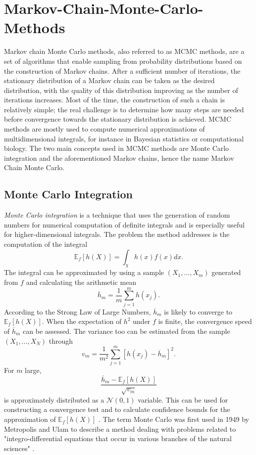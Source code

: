 \section{Markov-Chain-Monte-Carlo-Methods}
Markov chain Monte Carlo methods, also referred to as MCMC methods, are a set of algorithms that enable sampling from probability distributions based on the construction of Markov chains. After a sufficient number of iterations, the stationary distribution of a Markov chain can be taken as the desired distribution, with the quality of this distribution improving as the number of iterations increases. Most of the time, the construction of such a chain is relatively simple; the real challenge is to determine how many steps are needed before convergence towards the stationary distribution is achieved. MCMC methods are mostly used to compute numerical approximations of multidimensional integrals, for instance in Bayesian statistics or computational biology. The two main concepts used in MCMC methods are Monte Carlo integration and the aforementioned Markov chains, hence the name Markov Chain Monte Carlo.
\subsection{Monte Carlo Integration}
\textit{Monte Carlo integration} is a technique that uses the generation of random numbers for numerical computation of definite integrals and is especially useful for higher-dimensional integrals. The problem the method addresses is the computation of the integral
\begin{equation}
    \mathbb{E}_f\left[h\left(X\right)\right]=\int_\chi h(x)f(x)dx.
\end{equation}
The integral can be approximated by using a sample $\left(X_1,...,X_m\right)$ generated from $f$ and calculating the arithmetic mean
\begin{equation}
    \overline{h}_m=\frac{1}{m}\sum_{j=1}^mh\left(x_j\right).
\end{equation}
According to the Strong Law of Large Numbers, $\overline{h}_m$ is likely to converge to $\mathbb{E}_f\left[h\left(X\right)\right]$. When the expectation of $h^2$ under $f$ is finite, the convergence speed of $\overline{h}_m$ can be assessed. The variance too can be estimated from the sample $\left(X_1,...,X_N\right)$ through
\begin{equation}
    v_m=\frac{1}{m^2}\sum_{j=1}^m\left[h\left(x_j\right)-\overline{h}_m\right]^2.
\end{equation}
For $m$ large,
\begin{equation}
    \frac{\overline{h}_m-\mathbb{E}_f\left[h\left(X\right)\right]}{\sqrt{v_m}}
\end{equation}
is approximately distributed as a $\mathcal{N}(0,1)$ variable. This can be used for constructing a convergence test and to calculate confidence bounds for the approximation of $\mathbb{E}_f\left[h\left(X\right)\right]$ \autocite[][83--84]{robert2013monte}. The term Monte Carlo was first used in 1949 by Metropolis and Ulam to describe a method dealing with problems related to "integro-differential equations that occur in various branches of the natural sciences" \autocite[][]{metropolis1949monte}.
